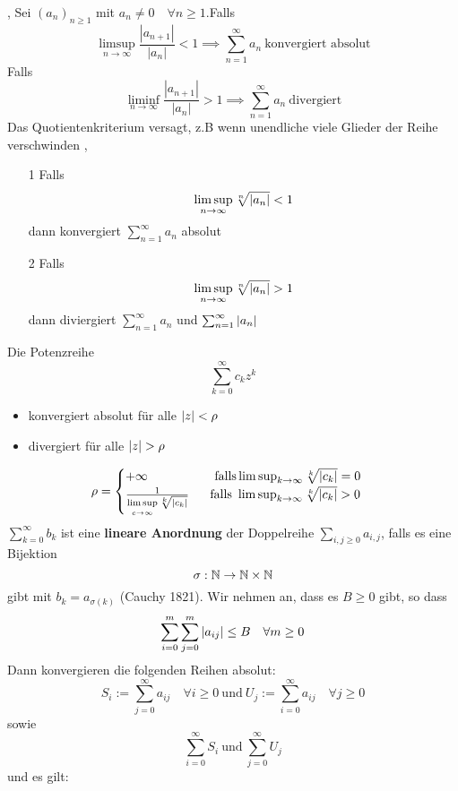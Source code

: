 \sep
\Satz[2.53(Quotientenkriterium] \newline Sei \((a_n)_{n \geq 1}\) mit \(a_n \neq 0 \quad \forall n \geq 1 \).Falls
\[\limsup\limits_{n \rightarrow \infty} \frac{\left|a_{n+1}\right|}{\left|a_{n}\right|}<1 \implies \sum_{n=1}^{\infty} a_{n} \ \text{konvergiert absolut}\]
Falls
\[\liminf\limits_{n \rightarrow \infty} \frac{\left|a_{n+1}\right|}{\left|a_{n}\right|}>1 \implies \sum_{n=1}^{\infty} a_{n} \ \text{divergiert}\]
 Das Quotientenkriterium versagt, z.B wenn unendliche viele Glieder der Reihe verschwinden
\sep
\Satz[2.56 Wurzelkriterium]
\begin{enumerate}
    \item [1] Falls \[\limsup\limits_{n \rightarrow \infty} \sqrt[n]{\left\lvert a_n \right\rvert} < 1\] dann konvergiert \(\sum_{n=1}^{\infty} a_n\) absolut
    \item [2] Falls \[\limsup\limits_{n \rightarrow \infty} \sqrt[n]{\left\lvert a_n \right\rvert} > 1\] dann diviergiert \(\sum_{n=1}^{\infty} a_n\) und \(\sum_{n=1}^{\infty}\left\lvert a_n \right\rvert \)
\end{enumerate}
\Korollar[2.57] Die Potenzreihe \[\sum_{k=0}^{\infty} c_kz^k\]
\begin{itemize}
    \item konvergiert absolut für alle $\left\lvert z \right\rvert < \rho$ 
    \item divergiert für alle $\left\lvert z \right\rvert > \rho$
    \end{itemize}
    \[\rho = \begin{cases}
        +\infty \quad \quad \quad \quad \quad \  \text{falls} \limsup_{k \rightarrow \infty} \sqrt[k]{\left\lvert c_k \right\rvert} = 0 \\
        \frac{1}{\limsup\limits_{c \rightarrow \infty} \sqrt[k]{\left|c_{k}\right|}}  \quad \  \ \text{falls } \limsup_{k \rightarrow \infty} \sqrt[k]{\left\lvert c_k \right\rvert} > 0
        \end{cases}\]
\Def[2.58] \(\sum_{k=0}^{\infty} b_k \) ist eine \textbf{lineare Anordnung} der Doppelreihe \(\sum_{i,j \geq 0} a_{i,j}\), falls es eine Bijektion \[\sigma : \mathbb{N} \rightarrow \mathbb{N} \times \mathbb{N} \] gibt mit \(b_k = a_{\sigma(k)}\) \newline
\Satz[2.59] (Cauchy 1821). Wir nehmen an, dass es \(B \geq 0\) gibt, so dass
\[\sum_{i=0}^{m}\sum_{j=0}^{m}\left\lvert a_{ij} \right\rvert \leq B \quad \forall m \geq 0\]
Dann konvergieren die folgenden Reihen absolut:
\[S_i := \sum_{j=0}^\infty a_{ij} \quad \forall i \geq 0 \  \text{und} \  U_j := \sum_{i=0}^{\infty}a_{ij} \quad \forall j \geq 0\]
sowie
\[\sum_{i=0}^\infty S_i \ \text{und} \ \sum_{j=0}^\infty U_j\]
und es gilt:

